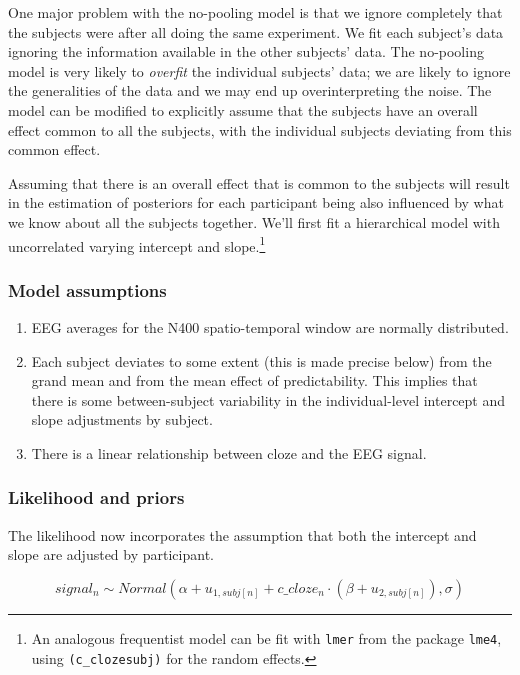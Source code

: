 \documentclass[12pt,]{krantz}
\providecommand{\tightlist}{%
  \setlength{\itemsep}{0pt}\setlength{\parskip}{0pt}}
\theoremstyle{definition}
\theoremstyle{definition}
\theoremstyle{definition}
\theoremstyle{remark}
\begin{document}
One major problem with the no-pooling model is that we ignore completely
that the subjects were after all doing the same experiment. We fit each
subject's data ignoring the information available in the other subjects'
data. The no-pooling model is very likely to \emph{overfit} the
individual subjects' data; we are likely to ignore the generalities of
the data and we may end up overinterpreting the noise. The model can be
modified to explicitly assume that the subjects have an overall effect
common to all the subjects, with the individual subjects deviating from
this common effect.

Assuming that there is an overall effect that is common to the subjects
will result in the estimation of posteriors for each participant being
also influenced by what we know about all the subjects together. We'll
first fit a hierarchical model with uncorrelated varying intercept and
slope.\footnote{An analogous frequentist model can be fit with
  \texttt{lmer} from the package \texttt{lme4}, using
  \texttt{(c\_cloze\textbar{}\textbar{}subj)} for the random effects.}

\subsubsection{Model assumptions}\label{model-assumptions-2}

\begin{enumerate}
\def\labelenumi{\arabic{enumi}.}
\tightlist
\item
  EEG averages for the N400 spatio-temporal window are normally
  distributed. 
\item
  Each subject deviates to some extent (this is made precise below) from
  the grand mean and from the mean effect of predictability. This
  implies that there is some between-subject variability in the
  individual-level intercept and slope adjustments by subject.
\item
  There is a linear relationship between cloze and the EEG signal.
\end{enumerate}

\subsubsection{Likelihood and priors}\label{likelihood-and-priors-3}

The likelihood now incorporates the assumption that both the intercept
and slope are adjusted by participant.

\begin{equation}
  signal_n \sim Normal(\alpha + u_{1,subj[n]} + c\_cloze_n \cdot (\beta+ u_{2,subj[n]}),\sigma)
 \end{equation}
\end{document}
